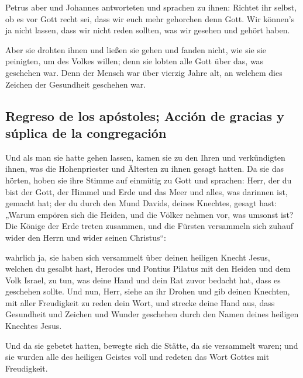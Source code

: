  Petrus aber und Johannes antworteten und sprachen zu
ihnen: Richtet ihr selbst, ob es vor Gott recht sei, dass wir euch mehr
gehorchen denn Gott.  Wir können's ja nicht lassen, dass
wir nicht reden sollten, was wir gesehen und gehört haben.

 Aber sie drohten ihnen und ließen sie gehen und fanden
nicht, wie sie sie peinigten, um des Volkes willen; denn sie lobten alle
Gott über das, was geschehen war.  Denn der Mensch war
über vierzig Jahre alt, an welchem dies Zeichen der Gesundheit geschehen
war.

\hypertarget{regreso-de-los-apuxf3stoles-acciuxf3n-de-gracias-y-suxfaplica-de-la-congregaciuxf3n}{%
\subsection{Regreso de los apóstoles; Acción de gracias y súplica de la
congregación}\label{regreso-de-los-apuxf3stoles-acciuxf3n-de-gracias-y-suxfaplica-de-la-congregaciuxf3n}}

 Und als man sie hatte gehen lassen, kamen sie zu den
Ihren und verkündigten ihnen, was die Hohenpriester und Ältesten zu
ihnen gesagt hatten.  Da sie das hörten, hoben sie ihre
Stimme auf einmütig zu Gott und sprachen: Herr, der du bist der Gott,
der Himmel und Erde und das Meer und alles, was darinnen ist, gemacht
hat;  der du durch den Mund Davids, deines Knechtes,
gesagt hast: „Warum empören sich die Heiden, und die Völker nehmen vor,
was umsonst ist?  Die Könige der Erde treten zusammen,
und die Fürsten versammeln sich zuhauf wider den Herrn und wider seinen
Christus``:

 wahrlich ja, sie haben sich versammelt über deinen
heiligen Knecht Jesus, welchen du gesalbt hast, Herodes und Pontius
Pilatus mit den Heiden und dem Volk Israel,  zu tun, was
deine Hand und dein Rat zuvor bedacht hat, dass es geschehen sollte.
 Und nun, Herr, siehe an ihr Drohen und gib deinen
Knechten, mit aller Freudigkeit zu reden dein Wort,  und
strecke deine Hand aus, dass Gesundheit und Zeichen und Wunder geschehen
durch den Namen deines heiligen Knechtes Jesus.

 Und da sie gebetet hatten, bewegte sich die Stätte, da
sie versammelt waren; und sie wurden alle des heiligen Geistes voll und
redeten das Wort Gottes mit Freudigkeit.

